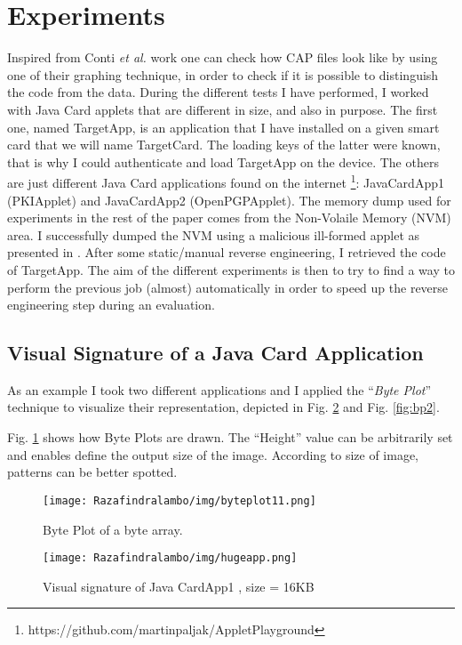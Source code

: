 \section{Experiments}
\label{section:exp}
Inspired from Conti \textit{et al.} work \cite{Conti:2008:VRE:1431913.1431914} one can check how CAP
files look like by using one of their graphing technique, in order to check if it is possible to
distinguish the code from the data. During the different tests I have
performed, I worked with Java Card applets that are different in size, and also
in purpose. The first one, named TargetApp, is an application that I have
installed on a given smart card that we will name TargetCard. The loading keys
of the latter were known, that is why I could authenticate and load TargetApp
on the device. The others are just different Java Card applications found on the
internet \footnote{https://github.com/martinpaljak/AppletPlayground}:
JavaCardApp1 (PKIApplet) and JavaCardApp2 (OpenPGPApplet).  The memory dump
used for experiments in the rest of the paper comes from the Non-Volaile Memory
(NVM) area. I successfully dumped the NVM using a malicious ill-formed applet
as presented in \cite{cardis15}. After some static/manual reverse engineering,
I retrieved the code of TargetApp. The aim of the different experiments is then
to try to find a way to perform the previous job (almost)
automatically in order to speed up the reverse engineering step during an evaluation.




\subsection{Visual Signature of a Java Card Application}

As an example I took two different applications and I applied the ``\textit{Byte
Plot}'' technique to visualize their representation, depicted in Fig. \ref{fig:bp1} and Fig. \ref{fig:bp2}.

Fig. \ref{fig:byteplot11} shows how Byte Plots are drawn. The ``Height'' value can be
arbitrarily set and enables define the output size of the image. According to size of image,
patterns can be better spotted. 
\begin{figure}[!h]
\center
    \texttt{[image: Razafindralambo/img/byteplot11.png]}
    \caption{Byte Plot of a byte array.}
    \label{fig:byteplot11}
\end{figure}

\begin{figure}[!h]
    \texttt{[image: Razafindralambo/img/hugeapp.png]}
    \caption{Visual signature of Java CardApp1 , size = 16KB}
    \label{fig:bp1}
\end{figure}


